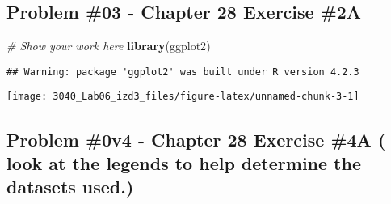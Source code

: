 \documentclass[
]{article}
\newenvironment{Shaded}{\begin{snugshade}}{\end{snugshade}}
\newcommand{\AttributeTok}[1]{\textcolor[rgb]{0.13,0.29,0.53}{#1}}
\newcommand{\CommentTok}[1]{\textcolor[rgb]{0.56,0.35,0.01}{\textit{#1}}}
\newcommand{\DecValTok}[1]{\textcolor[rgb]{0.00,0.00,0.81}{#1}}
\newcommand{\FloatTok}[1]{\textcolor[rgb]{0.00,0.00,0.81}{#1}}
\newcommand{\FunctionTok}[1]{\textcolor[rgb]{0.13,0.29,0.53}{\textbf{#1}}}
\newcommand{\NormalTok}[1]{#1}
\newcommand{\OtherTok}[1]{\textcolor[rgb]{0.56,0.35,0.01}{#1}}
\newcommand{\SpecialCharTok}[1]{\textcolor[rgb]{0.81,0.36,0.00}{\textbf{#1}}}
\newcommand{\StringTok}[1]{\textcolor[rgb]{0.31,0.60,0.02}{#1}}
\begin{document}
\hypertarget{problem-03---chapter-28-exercise-2a}{%
\subsection{Problem \#03 - Chapter 28 Exercise
\#2A}\label{problem-03---chapter-28-exercise-2a}}

\begin{Shaded}
\begin{Highlighting}[]
\CommentTok{\# Show your work here}
\FunctionTok{library}\NormalTok{(}\StringTok{\textquotesingle{}ggplot2\textquotesingle{}}\NormalTok{)}
\end{Highlighting}
\end{Shaded}

\begin{verbatim}
## Warning: package 'ggplot2' was built under R version 4.2.3
\end{verbatim}

\begin{Shaded}
\end{Shaded}

\texttt{[image: 3040\_Lab06\_izd3\_files/figure-latex/unnamed-chunk-3-1]}

\newpage

\hypertarget{problem-0v4---chapter-28-exercise-4a-look-at-the-legends-to-help-determine-the-datasets-used.}{%
\subsection{Problem \#0v4 - Chapter 28 Exercise \#4A ( look at the
legends to help determine the datasets
used.)}\label{problem-0v4---chapter-28-exercise-4a-look-at-the-legends-to-help-determine-the-datasets-used.}}
\end{document}
